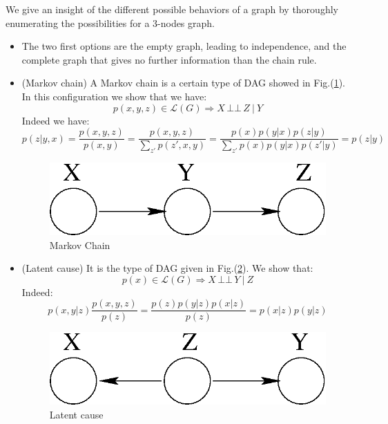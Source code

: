 \documentclass[12pt]{report}
\newcommand{\indep}{\ensuremath{\,\bot\!\!\!\bot\,}} %
\begin{document}
We give an insight of the different possible behaviors of a graph by thoroughly enumerating the possibilities for a 3-nodes graph. 
\begin{itemize}
	\item The two first options are the empty graph, leading to independence, and the complete graph that gives no further information than the chain rule.
	
	\item (Markov chain) A Markov chain is a certain type of DAG showed in Fig.(\ref{fig1}). In this configuration we show that we have:
	\begin{equation}
		p(x,y,z) \in \mathcal{L}(G) \Rightarrow X \indep Z\ |\ Y
	\label{eq:}
	\end{equation}
	Indeed we have:
	\begin{equation*}
	p(z|y,x) = \frac{p(x,y,z)}{p(x,y)} = \frac{p(x,y,z)}{\sum_{z'} p(z',x,y)} = \frac{p(x) p(y|x) p(z|y)}{\sum_{z'}p(x) p(y|x) p(z'|y)} = p(z|y)
	\end{equation*}
	\begin{figure}[h!]
		\centering
			\includegraphics[scale=.75]{fig1.eps}
		\caption{Markov Chain}\label{fig1}
	\end{figure}
	
	\item (Latent cause) It is the type of DAG given in Fig.(\ref{fig2}). We show that:
	\begin{equation}
		p(x) \in \mathcal{L}(G) \Rightarrow X \indep Y\ |\ Z
	\label{eq:}
	\end{equation}
	Indeed:
	\begin{equation*}
	p(x,y|z) \frac{p(x,y,z)}{p(z)} = \frac{p(z)p(y|z)p(x|z)}{p(z)} = p(x|z)p(y|z)
	\end{equation*}
	\begin{figure}[h!]
	\centering
	\includegraphics[scale=.75]{fig2.eps}
	\caption{Latent cause}
	\label{fig2}
	\end{figure}
	

\end{itemize}
\end{document}

